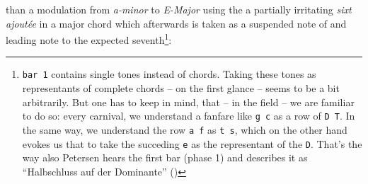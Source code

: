 \documentclass[
  DIV=calc,
  BCOR=5mm,
  12pt,
  headings=small,
  oneside,
  abstract=true,
  toc=bib,
  xcolor=dvipsnames,
  openany,
  english]{scrartcl}
\newcommand{\acc}[0]{\textit}
\begin{document}
than a modulation from \acc{a-minor} to \acc{E-Major} using the a partially
irritating \acc{sixt ajoutée} in a major chord which afterwards is taken as a
suspended note of and leading note to the expected seventh\footnote{\texttt{bar
1} contains single tones instead of chords. Taking these tones as
representants of complete chords -- on the first glance  -- seems to be a bit
arbitrarily. But one has to keep in mind, that -- in the field -- we are
familiar to do so: every carnival, we understand a fanfare like \texttt{g c} as
a row of \texttt{D T}. In the same way, we understand the row \texttt{a f} as
\texttt{t  s}, which on the other hand evokes us that to take the succeding
\texttt{e} as the representant of the \texttt{D}. That's the way also Petersen
hears the first bar (phase 1) and describes it as “Halbschluss auf der
Dominante” (\cite[cf.][51]{Petersen2019a}) }:
\end{document}
